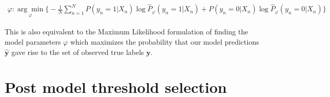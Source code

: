\documentclass{article}
\begin{document}
\begin{align}
    \varphi: \underset{\varphi}{\arg\min} \Big \{ -\frac{1}{N} \sum_{n=1}^N P(y_n=1\vert X_n) \log \hat{P}_\varphi(y_n=1\vert X_n) + P(y_n=0\vert X_n) \log \hat{P}_\varphi(y_n=0\vert X_n) \Big \}
\end{align}

This is also equivalent to the Maximum Likelihood formulation of finding the model parameters $\varphi$ which maximizes the probability that our model predictions $\hat{\mathbf{y}}$ gave rise to the set of observed true labels $\mathbf{y}$. 

\section{Post model threshold selection}
\end{document}
